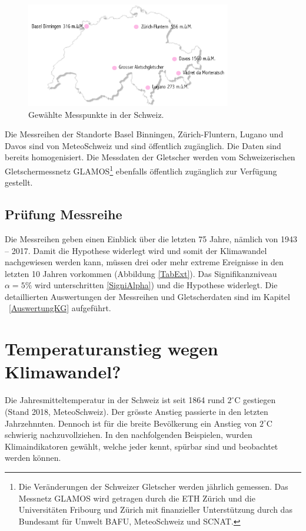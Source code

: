 \begin{refsection}
\begin{figure}
\centering
\includegraphics[width=0.8\textwidth]{extrem/Schweiz.pdf}
\caption{Gewählte Messpunkte in der Schweiz.}
\label{MesspunkteCH}
\end{figure}

Die Messreihen der Standorte Basel Binningen, Zürich-Fluntern, Lugano und Davos sind von MeteoSchweiz und sind öffentlich zugänglich. Die Daten sind bereits homogenisiert.
Die Messdaten der Gletscher werden vom Schweizerischen Gletschermessnetz GLAMOS\footnote{%
Die Veränderungen der Schweizer Gletscher werden jährlich gemessen. Das Messnetz GLAMOS wird getragen durch die ETH Zürich und die Universitäten Fribourg und Zürich mit finanzieller Unterstützung durch das Bundesamt für Umwelt BAFU, MeteoSchweiz und SCNAT.} ebenfalls öffentlich zugänglich zur Verfügung gestellt.


\subsection{Prüfung Messreihe}
Die Messreihen geben einen Einblick über die letzten 75 Jahre, nämlich von 1943 -- 2017. Damit die Hypothese widerlegt wird und somit der Klimawandel nachgewiesen werden kann, müssen drei oder mehr extreme Ereignisse in den letzten 10 Jahren vorkommen (Abbildung \ref{TabExt}). Das Signifikanzniveau $\alpha = 5\%$ wird unterschritten \ref{SigniAlpha}) und die Hypothese widerlegt.
Die detaillierten Auswertungen der Messreihen und Gletscherdaten sind im Kapitel ~\ref{AuswertungKG}  aufgeführt.


\section{Temperaturanstieg wegen Klimawandel?}
Die Jahresmitteltemperatur in der Schweiz ist seit 1864 rund $2^{\circ}$C gestiegen (Stand 2018, MeteoSchweiz). Der grösste Anstieg passierte in den letzten Jahrzehnnten. Dennoch ist für die breite Bevölkerung ein Anstieg von $2^{\circ}$C schwierig nachzuvollziehen.
In den nachfolgenden Beispielen, wurden Klimaindikatoren gewählt, welche jeder kennt, spürbar sind und beobachtet werden können.


\end{refsection}
